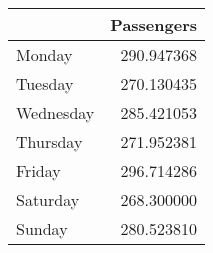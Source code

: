 \begin{tabular}{lr}
\toprule
{} &  Passengers \\
\midrule
Monday    &  290.947368 \\
Tuesday   &  270.130435 \\
Wednesday &  285.421053 \\
Thursday  &  271.952381 \\
Friday    &  296.714286 \\
Saturday  &  268.300000 \\
Sunday    &  280.523810 \\
\bottomrule
\end{tabular}
